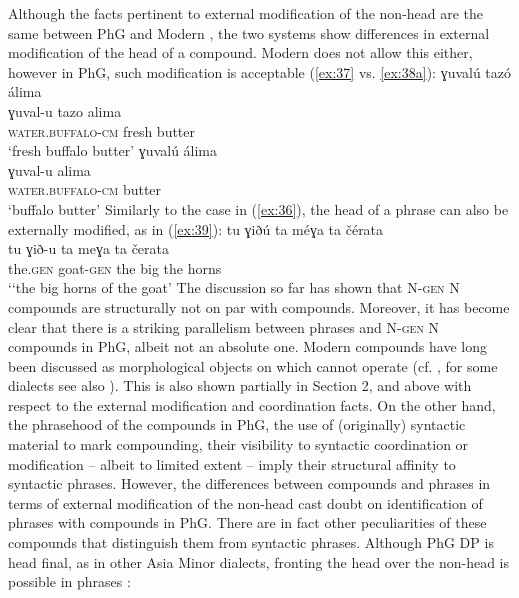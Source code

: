 \documentclass[output=paper]{LSP/langsci}
\begin{document}
Although the facts pertinent to external modification of the non-head are the same between PhG and Modern , the two systems show differences in external modification of the head of a compound. Modern  does not allow this either, however in PhG, such modification is acceptable (\ref{ex:37} vs. \ref{ex:38a}): 
\z
{} 
	\ea\label{ex:38a}
		\glll ɣuvalú tazó álima\\
				ɣuval-u tazo alima\\
				\textsc{water.buffalo-cm} fresh butter\\
		\glt `fresh buffalo butter'
	\ex\label{ex:38b}
		\glll ɣuvalú álima\\
				ɣuval-u  alima\\
				\textsc{water.buffalo-cm} butter\\
		\glt `buffalo butter'
	\z
\z
Similarly to the case in (\ref{ex:36}), the head of a  phrase can also be externally modified, as in (\ref{ex:39}):
\ea\label{ex:39}
	\glll  tu ɣiðú ta méɣa ta čérata\\
			 tu ɣið-u ta meɣa ta čerata\\
			the.\textsc{gen} goat-\textsc{gen} the big  the horns\\
	\glt `‘the big horns of the goat’ 
\z
The discussion so far has shown that N-\textsc{gen} N compounds are structurally not on par with  compounds. Moreover, it has become clear that there is a striking parallelism between  phrases and N-\textsc{gen} N compounds in PhG, albeit not an absolute one. Modern  compounds have long been discussed as morphological objects on which  cannot operate (cf. \citealt{Ralli2013moderngreek}, for some dialects see also \citealt{Andreou2014}). This is also shown partially in Section 2, and above with respect to the external modification and coordination facts. On the other hand, the  phrasehood of the compounds in PhG, the use of (originally) syntactic material to mark compounding, their visibility to syntactic coordination or modification -- albeit to limited extent -- imply their structural affinity to syntactic phrases. However, the differences between compounds and  phrases in terms of external modification of the non-head cast doubt on identification of phrases with compounds in PhG. There are in fact other peculiarities of these compounds that distinguish them from syntactic phrases. Although PhG DP is head final, as in other Asia Minor  dialects, fronting the head over the non-head is possible in  phrases \citep{Bagriacik}:
 
\end{document}
